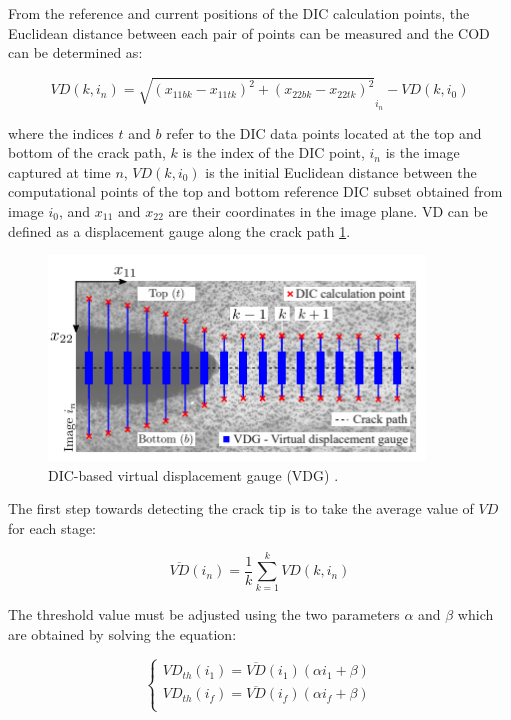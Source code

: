 \documentclass[3p,times,procedia]{elsarticle}
\begin{document}
From the reference and current positions of the DIC calculation points, the Euclidean distance between each pair of points can be measured and the COD can be determined as:

\begin{equation}
	VD(k,i_n)=\sqrt{(x_{11bk}-x_{11tk})^2 + (x_{22bk}-x_{22tk})^2}_{i_n} - VD(k,i_0)
	\label{eq:eq23}
\end{equation}

where the indices $t$ and $b$ refer to the DIC data points located at the top and bottom of the crack path, $k$ is the index of the DIC point, $i_n$ is the image captured at time $n$, $VD(k, i_0)$ is the initial Euclidean distance between the computational points of the top and bottom reference DIC subset obtained from image $i_0$, and $x_{11}$ and $x_{22}$ are their coordinates in the image plane. VD can be defined as a displacement gauge along the crack path \ref{fig:fig30}.

\begin{figure}[htp]
	\centering
	\includegraphics[width=10cm]{Figures/fig30}
	\caption{DIC-based virtual displacement gauge (VDG) \citep{FilhoJ2022}.}
	\label{fig:fig30}
\end{figure}

The first step towards detecting the crack tip is to take the average value of $VD$ for each stage:

\begin{equation}
	\overline{VD}(i_n)=\frac{1}{k} \sum_{k=1}^{k}VD(k,i_n)
	\label{eq:eq24}
\end{equation}

The threshold value must be adjusted using the two parameters $\alpha$ and $\beta$ which are obtained by solving the equation:

\begin{equation}
	\begin{cases}
		VD_{th}(i_1)=\overline{VD}(i_1)(\alpha i_1 +\beta)\\
		VD_{th}(i_f)=\overline{VD}(i_f)(\alpha i_f +\beta)\\ 
	\end{cases}
	\label{eq:eq25}
\end{equation}
\end{document}
